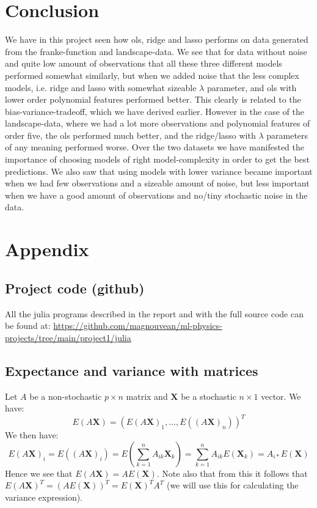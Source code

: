 \documentclass{article}
\begin{document}
\section{Conclusion}
We have in this project seen how ols, ridge and lasso performs on data generated
from the franke-function and landscape-data. We see that for data without noise
and quite low amount of observations that all these three different models
performed somewhat similarly, but when we added noise that the less
complex models, i.e. ridge and lasso with somewhat sizeable $\lambda$ parameter,
and ols with lower order polynomial features performed better. This clearly is
related to the bias-variance-tradeoff, which we have derived earlier. However in
the case of the landscape-data, where we had a lot more observations and
polynomial features of order five, the ols performed much better, and the
ridge/lasso with $\lambda$ parameters of any meaning performed worse. Over the
two datasets we have manifested the importance of choosing models of right
model-complexity in order to get the best predictions. We also saw that using
models with lower variance became important when we had few observations and a
sizeable amount of noise, but less important when we have a good amount of
observations and no/tiny stochastic noise in the data.

\section{Appendix}

\subsection{Project code (github)}
All the julia programs described in the report and with the full source code can be
found at:
\url{https://github.com/magnouvean/ml-physics-projects/tree/main/project1/julia}

\subsection{Expectance and variance with matrices}
Let $A$ be a non-stochastic $p \times n$ matrix and $\mathbf{X}$ be a stochastic
$n \times 1$ vector. We have:
$$E(A \mathbf{X}) = (E(A \mathbf{X})_1, \dots, E((A \mathbf{X})_n))^T$$
We then have:
$$E(A \mathbf{X})_i = E((A \mathbf{X})_i) = E(\sum_{k=1}^n A_{i k} \mathbf{X}_k) = \sum_{k=1}^n A_{i k} E(\mathbf{X}_k) = A_{i *} E(\mathbf{X})$$
Hence we see that $E(A \mathbf{X}) = A E(\mathbf{X})$.
Note also that from this it follows that $E(A \mathbf{X})^T = (A
    E(\mathbf{X}))^T = E(\mathbf{X})^T A^T$ (we will use this for calculating the
variance expression).
\end{document}
